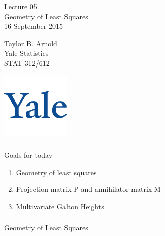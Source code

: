 



\begin{frame}[fragile] \frametitle{}

\vfill

{\fontsize{0.7cm}{0cm}\selectfont Lecture 05 \\\vspace{0.2cm}
Geometry of Least Squares}\\\vspace{0.5cm}
16 September 2015

\vspace{2cm}

\begin{minipage}{0.6\textwidth}
Taylor B. Arnold \\
Yale Statistics \\
STAT 312/612
\end{minipage}
\hfill
\begin{minipage}{0.3\textwidth}\raggedleft
\includegraphics[scale=0.3]{../yale-logo.png}
\end{minipage}%

\end{frame}

\begin{frame}[fragile] \frametitle{}

{\color{yaleblue}\fontsize{16pt}{20pt}\selectfont Goals for today}

\begin{enumerate}
\item Geometry of least squares
\item Projection matrix P and annihilator matrix M
\item Multivariate Galton Heights
\end{enumerate}

\end{frame}

\begin{frame}[fragile] \frametitle{}

\begin{flushright}
{\color{yaleblue}\sc\fontsize{1cm}{0cm}\selectfont Geometry of Least Squares}
\end{flushright}

\end{frame}

